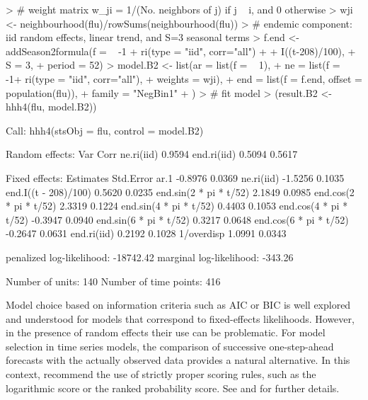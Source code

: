 \documentclass[a4paper,11pt]{article}
\begin{document}
\begin{Schunk}
\begin{Sinput}
> # weight matrix w_ji = 1/(No. neighbors of j) if j ~ i, and 0 otherwise
> wji <- neighbourhood(flu)/rowSums(neighbourhood(flu))
> # endemic component: iid random effects, linear trend, and S=3 seasonal terms
> f.end <- addSeason2formula(f = ~ -1 + ri(type = "iid", corr="all") + 
+                                 I((t-208)/100), 
+                                 S = 3, 
+                                 period = 52)
> model.B2 <- list(ar = list(f = ~ 1),
+                  ne = list(f = ~ -1+ ri(type = "iid", corr="all"), 
+                            weights = wji),
+                  end = list(f = f.end, offset = population(flu)),
+                  family = "NegBin1"
+                  )
> # fit model
> (result.B2 <- hhh4(flu, model.B2))
\end{Sinput}
\end{Schunk}
\begin{Schunk}
\begin{Soutput}
Call: 
hhh4(stsObj = flu, control = model.B2)

Random effects: 
            Var    Corr   
ne.ri(iid)  0.9594        
end.ri(iid) 0.5094 0.5617 


Fixed effects: 
                        Estimates  Std.Error
ar.1                      -0.8976     0.0369
ne.ri(iid)                -1.5256     0.1035
end.I((t - 208)/100)       0.5620     0.0235
end.sin(2 * pi * t/52)     2.1849     0.0985
end.cos(2 * pi * t/52)     2.3319     0.1224
end.sin(4 * pi * t/52)     0.4403     0.1053
end.cos(4 * pi * t/52)    -0.3947     0.0940
end.sin(6 * pi * t/52)     0.3217     0.0648
end.cos(6 * pi * t/52)    -0.2647     0.0631
end.ri(iid)                0.2192     0.1028
1/overdisp                 1.0991     0.0343

penalized log-likelihood:  -18742.42 
marginal log-likelihood:   -343.26 

Number of units:          140 
Number of time points:    416 
\end{Soutput}
\end{Schunk}
Model choice based on information criteria such as AIC or BIC is well
explored and understood for models that correspond to fixed-effects likelihoods.
However, in the presence of random effects their use can be problematic.
For model selection in time series models, the comparison of successive 
one-step-ahead forecasts with the actually observed data 
provides a natural alternative. In this context, \cite{gneiting-raftery-2007}
recommend the use of strictly proper scoring 
rules, such as the logarithmic score or the ranked probability score.
See \cite{czado-etal-2009} and \cite{paul-held-2011} for further details.
\end{document}
